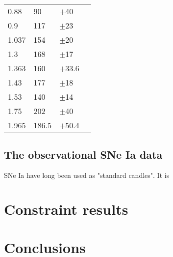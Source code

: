 \documentclass{aa}
\begin{document}
\begin{table}[htbp]
\begin{tabular}{llll}
         0.88 & 90 & $\pm$40 & \cite{Daniel.Stern_2010} \\
         0.9 & 117 & $\pm$23 & \cite{PhysRevD.71.123001} \\
         1.037 & 154 & $\pm$20 & \cite{M.Moresco_2012} \\
         1.3 & 168 & $\pm$17 & \cite{PhysRevD.71.123001} \\
         1.363 & 160 & $\pm$33.6 & \cite{10.1093/mnrasl/slv037} \\
         1.43 & 177 & $\pm$18 & \cite{PhysRevD.71.123001} \\
         1.53 & 140 & $\pm$14 & \cite{PhysRevD.71.123001} \\
         1.75 & 202 & $\pm$40 & \cite{PhysRevD.71.123001} \\
         1.965 & 186.5 & $\pm$50.4 & \cite{10.1093/mnrasl/slv037} \\
         \hline    
      \end{tabular}
      \label{tab:1}
   \end{table}

\subsection{The observational SNe Ia data}

   SNe Ia have long been used as "standard candles". It is 

\section{Constraint results}

\section{Conclusions}



\end{document}
